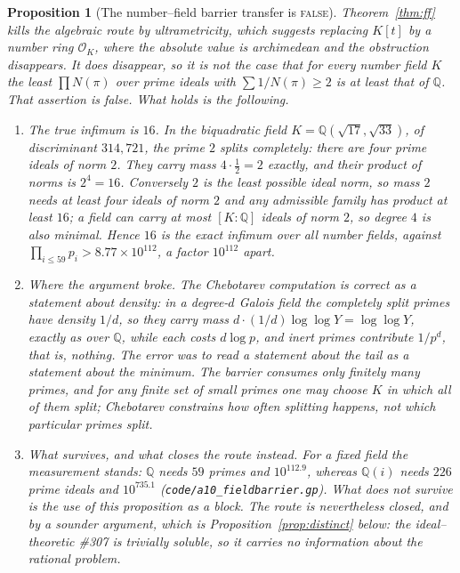 \documentclass[11pt]{article}
\newtheorem{proposition}[theorem]{Proposition}
\theoremstyle{definition}
\begin{document}
\begin{proposition}[The number--field barrier transfer is \textsc{false}]\label{prop:fieldoptimal}
Theorem~\ref{thm:ff} kills the algebraic route by ultrametricity, which suggests replacing $K[t]$ by
a number ring $\mathcal{O}_K$, where the absolute value is archimedean and the obstruction
disappears. It does disappear, so it is not the case that for every number field $K$ the least $\prod N(\pi)$ over prime ideals with $\sum1/N(\pi)\ge2$ is
at least that of $\mathbb{Q}$. That assertion is false. What holds is the following.
\begin{enumerate}[label=\textup{(\roman*)},leftmargin=2.2em]
\item \emph{The true infimum is $16$.} In the biquadratic field
$K=\mathbb{Q}(\sqrt{17},\sqrt{33})$, of discriminant $314{,}721$, the prime $2$ splits completely:
there are four prime ideals of norm $2$. They carry mass $4\cdot\tfrac12=2$ exactly, and their
product of norms is $2^4=16$. Conversely $2$ is the least possible ideal norm, so mass $2$ needs at
least four ideals of norm $2$ and any admissible family has product at least $16$; a field can carry
at most $[K:\mathbb{Q}]$ ideals of norm $2$, so degree $4$ is also minimal. Hence $16$ is the exact
infimum over all number fields, against $\prod_{i\le59}p_i>8.77\times10^{112}$, a factor $10^{112}$ apart.
\item \emph{Where the argument broke.} The Chebotarev computation is correct as a statement about
\emph{density}: in a degree-$d$ Galois field the completely split primes have density $1/d$, so they
carry mass $d\cdot(1/d)\log\log Y=\log\log Y$, exactly as over $\mathbb{Q}$, while each costs
$d\log p$, and inert primes contribute $1/p^{d}$, that is, nothing. The error was to read a
statement about the tail as a statement about the minimum. The barrier consumes only \emph{finitely
many} primes, and for any finite set of small primes one may choose $K$ in which all of them split;
Chebotarev constrains how often splitting happens, not which particular primes split.
\item \emph{What survives, and what closes the route instead.} For a \emph{fixed} field the
measurement stands: $\mathbb{Q}$ needs $59$ primes and $10^{112.9}$, whereas $\mathbb{Q}(i)$ needs
$226$ prime ideals and $10^{735.1}$ \textup{(\texttt{code/a10\_fieldbarrier.gp})}. What does not
survive is the use of this proposition as a \emph{block}. The route is nevertheless closed, and by a
sounder argument, which is Proposition~\ref{prop:distinct} below: the ideal--theoretic \#307 is
\emph{trivially soluble}, so it carries no information about the rational problem.
\end{enumerate}
\end{proposition}
\end{document}
